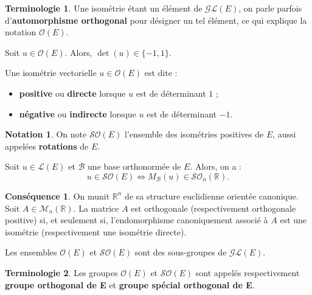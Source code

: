 \documentclass[french]{article}
\newcommand{\R}{\mathbb{R}}
\theoremstyle{plain}
\theoremstyle{definition}
\newtheorem*{notation}{Notation}
\newtheorem*{terminologie}{Terminologie}
\newtheorem*{conséquence}{Conséquence}
\theoremstyle{remark}
\begin{document}
\begin{terminologie}
	Une isométrie étant un élément de $\mathcal{GL}(E)$, on parle parfois d'\textbf{automorphisme orthogonal} pour désigner un tel élément, ce qui explique la notation $\mathcal{O}(E)$.
\end{terminologie}

\begin{prop}
	Soit $u\in\mathcal{O}(E)$. Alors, $\det(u)\in\{-1,1\}$.
\end{prop}

\begin{dfn}
	Une isométrie vectorielle $u\in\mathcal{O}(E)$ est dite :
	\begin{itemize}
		\item \textbf{positive} ou \textbf{directe} lorsque $u$ est de déterminant $1$ ;
		\item \textbf{négative} ou \textbf{indirecte} lorsque $u$ est de déterminant $-1$.
	\end{itemize}
\end{dfn}

\begin{notation}
	On note $\mathcal{SO}(E)$ l'ensemble des isométries positives de $E$, aussi appelées \textbf{rotations} de $E$.
\end{notation}

\begin{prop}
	Soit $u\in\mathcal{L}(E)$ et $\mathcal{B}$ une base orthonormée de $E$. Alors, on a : $$u\in\mathcal{SO}(E)\iff M_\mathcal{B}(u)\in\mathcal{SO}_n(\R).$$
\end{prop}

\begin{conséquence}
	On munit $\R^n$ de sa structure euclidienne orientée canonique. Soit $A\in\mathcal{M}_n(\R)$. La matrice $A$ est orthogonale (respectivement orthogonale positive) si, et seulement si, l'endomorphisme canoniquement associé à $A$ est une isométrie (respectivement une isométrie directe).
\end{conséquence}

\begin{cor}{}
	Les ensembles $\mathcal{O}(E)$ et $\mathcal{SO}(E)$ sont des sous-groupes de $\mathcal{GL}(E)$.
\end{cor}

\begin{terminologie}
	Les groupes $\mathcal{O}(E)$ et $\mathcal{SO}(E)$ sont appelés respectivement \textbf{groupe orthogonal de E} et \textbf{groupe spécial orthogonal de E}.
\end{terminologie}
\end{document}
